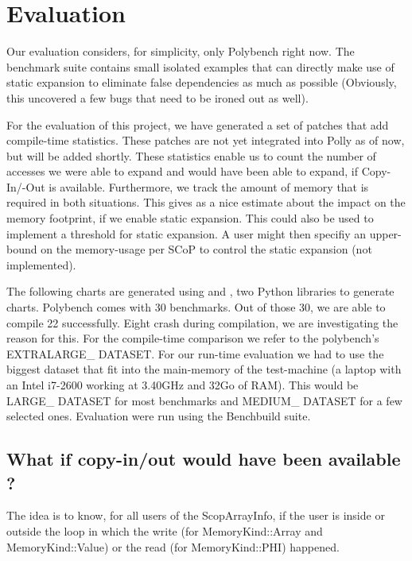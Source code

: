 \chapter{Evaluation}\label{ch:Evaluation}

Our evaluation considers, for simplicity, only Polybench\cite{Polybench} right now. The benchmark suite contains small isolated examples that can directly make use of static expansion to eliminate false dependencies as much as possible (Obviously, this uncovered a few bugs that need to be ironed out as well).

For the evaluation of this project, we have generated a set of patches that add compile-time statistics. These patches are not yet integrated into Polly as of now, but will be added shortly. These statistics enable us to count the number of accesses we were able to expand and would have been able to expand, if Copy-In/-Out is available. Furthermore, we track the amount of memory that is required in both situations. This gives as a nice estimate about the impact on the memory footprint, if we enable static expansion. This could also be used to implement a threshold for static expansion. A user might then specifiy an upper-bound on the memory-usage per SCoP to control the static expansion (not implemented).

The following charts are generated using  and , two Python libraries to generate charts. Polybench comes with 30 benchmarks. Out of those 30, we are able to compile 22 successfully. Eight crash during compilation, we are investigating the reason for this. For the compile-time comparison we refer to the polybench’s EXTRALARGE\_ DATASET. For our run-time evaluation we had to use the biggest dataset that fit into the main-memory of the test-machine (a laptop with an Intel i7-2600 working at 3.40GHz and 32Go of RAM). This would be LARGE\_ DATASET for most benchmarks and MEDIUM\_ DATASET for a few selected ones. Evaluation were run using the Benchbuild suite\cite{Benchbuild}.

\section{What if copy-in/out would have been available ?}
The idea is to know, for all users of the ScopArrayInfo, if the user is inside or outside the loop in which the write (for MemoryKind::Array and MemoryKind::Value) or the read (for MemoryKind::PHI) happened.

